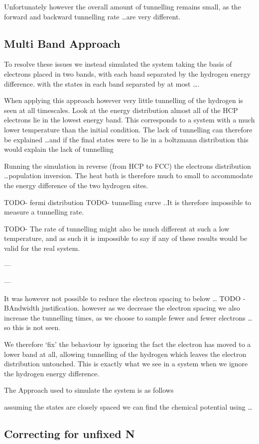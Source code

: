 Unfortunately however the overall
amount of tunnelling remains small,
as the forward and backward tunnelling
rate \ldots are very different.

\subsection{Multi Band Approach}
To resolve these issues we instead simulated the system
taking the basis of electrons placed in two bands,
with each band separated by the hydrogen energy
difference.
with
the states in each band separated by at most \ldots.


When applying this approach however very
little tunnelling of the hydrogen is seen at all timescales.
Look at the energy distribution almost all
of the HCP electrons lie in the lowest energy band.
This corresponds to a system with a much lower
temperature than the initial condition.
The lack of tunnelling can therefore be explained
\ldots and if
the final states were to lie in a boltzmann  distribution
this would explain the lack of tunnelling

Running the simulation
in reverse (from HCP to FCC) the electrons
distribution \ldots population inversion.
The heat bath is therefore much to small
to accommodate the energy difference of
the two hydrogen sites.

TODO- fermi distribution
TODO- tunnelling curve
..It is therefore impossible to measure a tunnelling
rate.

TODO- The rate of tunnelling might also
be much different at such a low temperature,
and as such it is impossible to say if
any of these results would be valid
for the real system.


---

---

It was however not possible to
reduce the electron spacing to
below \ldots
TODO -BAndwidth justification.
however as we decrease the electron
spacing we also increase the tunnelling
times, as we choose to sample fewer and
fewer electrons \ldots so this is not seen.






We
therefore `fix' the behaviour by
ignoring the fact the electron
has moved to a lower band at all,
allowing tunnelling of the hydrogen
which leaves the electron distribution
untouched. This is exactly what
we see in a system when we ignore
the hydrogen energy difference.


The Approach used to simulate the system is as follows


assuming the states are closely spaced we can find the
chemical potential using \ldots

\subsection{Correcting for unfixed N}